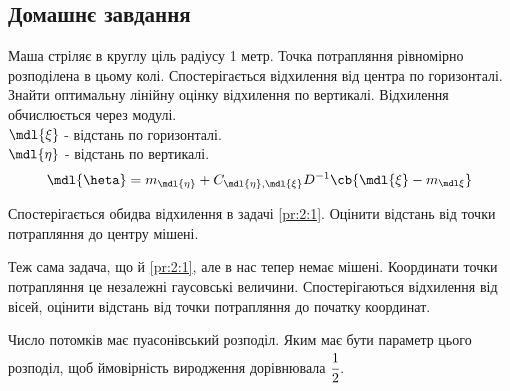 \subsection{Домашнє завдання}
\begin{tsk}\label{pr:2:1}
Маша стріляє в круглу ціль радіусу 1 метр. Точка потрапляння рівномірно розподілена в цьому колі. Спостерігається відхилення від центра по горизонталі. Знайти оптимальну лінійну оцінку відхилення по вертикалі. Відхилення обчислюється через модулі.\\
$\mdl{\xi}$ - відстань по горизонталі.\\
$\mdl{\eta}$ - відстань по вертикалі.\\
\begin{equation}
\mdl{\heta} = m_{\mdl{\eta}} + C_{\mdl{\eta},\mdl{\xi}} D^{-1}\cb{\mdl{\xi}-m_{\mdl\xi}}
\end{equation}
\end{tsk}
\begin{tsk}
Спостерігається обидва відхилення в задачі \eqref{pr:2:1}. Оцінити відстань від точки потрапляння до центру мішені. 
\end{tsk}
\begin{tsk}
Теж сама задача, що й \eqref{pr:2:1}, але в нас тепер немає мішені. Координати точки потрапляння це незалежні гаусовські величини. Спостерігаються відхилення від вісей, оцінити відстань від точки потрапляння до початку координат.
\end{tsk}
\begin{tsk}
Число потомків має пуасонівський розподіл. Яким має бути параметр цього розподіл, щоб ймовірність виродження дорівнювала $\cfrac12$.
\end{tsk}